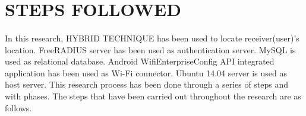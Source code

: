 \section{STEPS FOLLOWED}

\paragraph{}
In this research, HYBRID TECHNIQUE has been used to locate receiver(user)'s location. FreeRADIUS server has been used as authentication server. MySQL is used as relational database. Android WifiEnterpriseConfig API integrated application has been used as Wi-Fi connector. Ubuntu 14.04 server is used as host server. This research process has been done through a series of steps and with phases. The steps that have been carried out throughout the research are as follows.

